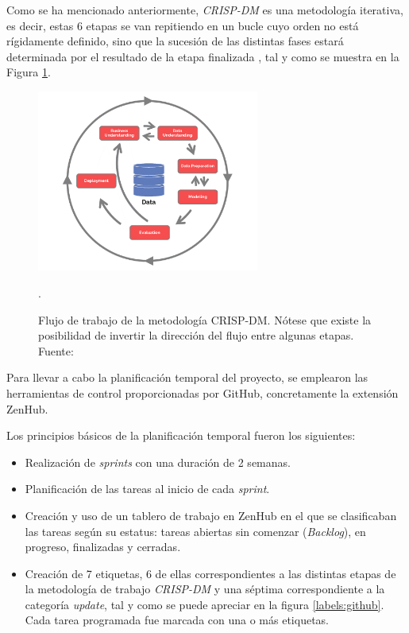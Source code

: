Como se ha mencionado anteriormente, \textit{CRISP-DM} es una metodología iterativa, es decir, estas 6 etapas se van repitiendo en un bucle cuyo orden no está rígidamente definido, sino que la sucesión de las distintas fases estará determinada por el resultado de la etapa finalizada \cite{crispdm:niaksu}, tal y como se muestra en la Figura \ref{crispdm:flujo}.

\begin{figure}[h]
    \centering
    \includegraphics[width=0.65\textwidth]{img/CRISP-DM.png}
    \caption{Flujo de trabajo de la metodología CRISP-DM. Nótese que existe la posibilidad de invertir la dirección del flujo entre algunas etapas. Fuente: \cite{crispdm:flujo}}.
    \label{crispdm:flujo}
\end{figure}

Para llevar a cabo la planificación temporal del proyecto, se emplearon las herramientas de control proporcionadas por GitHub, concretamente la extensión ZenHub. 

Los principios básicos de la planificación temporal fueron los siguientes:

\begin{itemize}[itemsep=0.1em]
    \item Realización de \textit{sprints} con una duración de 2 semanas.
    \item Planificación de las tareas al inicio de cada \textit{sprint}.
    \item Creación y uso de un tablero de trabajo en ZenHub en el que se clasificaban las tareas según su estatus: tareas abiertas sin comenzar (\textit{Backlog}), en progreso, finalizadas y cerradas.
    \item Creación de 7 etiquetas, 6 de ellas correspondientes a las distintas etapas de la metodología de trabajo \textit{CRISP-DM} y una séptima correspondiente a la categoría \textit{update}, tal y como se puede apreciar en la figura \ref{labels:github}. Cada tarea programada fue marcada con una o más etiquetas.
\end{itemize}

